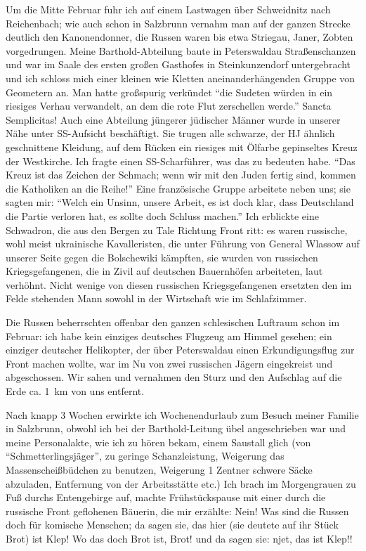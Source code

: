 Um die Mitte Februar fuhr ich auf einem Lastwagen über Schweidnitz nach Reichenbach; wie auch schon in Salzbrunn vernahm man auf der ganzen Strecke deutlich den Kanonendonner, die Russen waren bis etwa Striegau, Janer, Zobten vorgedrungen. Meine Barthold-Abteilung baute in Peterswaldau Straßenschanzen und war im Saale des ersten  großen Gasthofes in Steinkunzendorf untergebracht und ich schloss mich einer kleinen wie Kletten aneinanderhängenden Gruppe von Geometern an. Man hatte großspurig verkündet \enquote{die Sudeten würden in ein riesiges Verhau verwandelt, an dem die rote Flut zerschellen werde.} Sancta Semplicitas! Auch eine Abteilung jüngerer jüdischer Männer wurde in unserer Nähe unter SS-Aufsicht beschäftigt. Sie trugen alle schwarze, der HJ ähnlich geschnittene Kleidung, auf dem Rücken ein riesiges mit Ölfarbe gepinseltes Kreuz der Westkirche. Ich fragte einen SS-Scharführer, was das zu bedeuten habe. \enquote{Das Kreuz ist das Zeichen der Schmach; wenn wir mit den Juden fertig sind, kommen die Katholiken an die Reihe!} Eine französische Gruppe arbeitete neben uns; sie sagten mir: \enquote{Welch ein Unsinn, unsere Arbeit, es ist doch klar, dass Deutschland die Partie verloren hat, es sollte doch Schluss machen.} Ich erblickte eine Schwadron, die aus den Bergen zu Tale Richtung Front ritt: es waren russische, wohl meist ukrainische Kavalleristen, die unter Führung von General Wlassow auf unserer Seite gegen die Bolschewiki kämpften, sie wurden von russischen Kriegsgefangenen, die in Zivil auf  deutschen Bauernhöfen arbeiteten, laut verhöhnt. Nicht wenige von diesen russischen Kriegsgefangenen ersetzten den im Felde stehenden Mann sowohl in der Wirtschaft wie im Schlafzimmer.

Die Russen beherrschten offenbar den ganzen schlesischen Luftraum schon im Februar: ich habe kein einziges deutsches Flugzeug am Himmel gesehen; ein einziger deutscher Helikopter, der über Peterswaldau einen Erkundigungsflug zur Front machen wollte, war im Nu von zwei russischen Jägern eingekreist und abgeschossen. Wir sahen und vernahmen den Sturz und den Aufschlag auf die Erde ca. 1~km von uns entfernt.

Nach knapp 3 Wochen erwirkte ich Wochenendurlaub zum Besuch meiner Familie in Salzbrunn, obwohl ich bei der Barthold-Leitung übel angeschrieben war und meine Personalakte, wie ich zu hören bekam, einem Saustall glich (von \enquote{Schmetterlingsjäger}, zu geringe Schanzleistung, Weigerung das Massenscheißbüdchen zu benutzen, Weigerung 1 Zentner schwere Säcke abzuladen, Entfernung von der Arbeitsstätte etc.)
Ich brach im Morgengrauen zu Fuß durchs Entengebirge auf, machte Frühstückspause mit einer durch die russische Front geflohenen Bäuerin, die mir erzählte: Nein! Was sind die Russen doch für komische Menschen; da sagen sie, das hier (sie deutete auf ihr Stück Brot) ist Klep! Wo  das doch Brot ist, Brot! und da sagen sie: njet, das ist Klep!!

